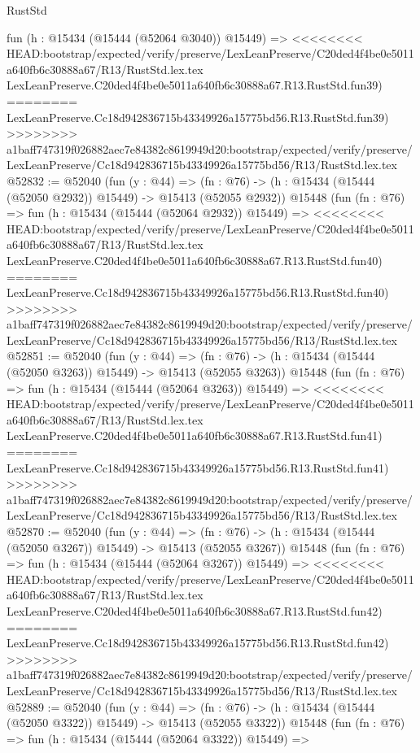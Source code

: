 \begin{lexlean}{RustStd}
\begin{coremodule}
{\begin{coremodule}
{{{{{{{{{{{{{{{{{{{{{{{{{{{{{{{{{{{{{{{{{{{{{{{{{{{{{{{{{{{{    fun (h : @15434 (@15444 (@52064 @3040)) @15449) =>
<<<<<<<< HEAD:bootstrap/expected/verify/preserve/LexLeanPreserve/C20ded4f4be0e5011a640fb6c30888a67/R13/RustStd.lex.tex
    LexLeanPreserve.C20ded4f4be0e5011a640fb6c30888a67.R13.RustStd.fun39)
========
    LexLeanPreserve.Cc18d942836715b43349926a15775bd56.R13.RustStd.fun39)
>>>>>>>> a1baff747319f026882aec7e84382c8619949d20:bootstrap/expected/verify/preserve/LexLeanPreserve/Cc18d942836715b43349926a15775bd56/R13/RustStd.lex.tex
@52832 := @52040
    (fun (y : @44) =>
    (fn : @76) -> (h : @15434 (@15444 (@52050 @2932)) @15449) -> @15413 (@52055 @2932))
    @15448
    (fun (fn : @76) =>
    fun (h : @15434 (@15444 (@52064 @2932)) @15449) =>
<<<<<<<< HEAD:bootstrap/expected/verify/preserve/LexLeanPreserve/C20ded4f4be0e5011a640fb6c30888a67/R13/RustStd.lex.tex
    LexLeanPreserve.C20ded4f4be0e5011a640fb6c30888a67.R13.RustStd.fun40)
========
    LexLeanPreserve.Cc18d942836715b43349926a15775bd56.R13.RustStd.fun40)
>>>>>>>> a1baff747319f026882aec7e84382c8619949d20:bootstrap/expected/verify/preserve/LexLeanPreserve/Cc18d942836715b43349926a15775bd56/R13/RustStd.lex.tex
@52851 := @52040
    (fun (y : @44) =>
    (fn : @76) -> (h : @15434 (@15444 (@52050 @3263)) @15449) -> @15413 (@52055 @3263))
    @15448
    (fun (fn : @76) =>
    fun (h : @15434 (@15444 (@52064 @3263)) @15449) =>
<<<<<<<< HEAD:bootstrap/expected/verify/preserve/LexLeanPreserve/C20ded4f4be0e5011a640fb6c30888a67/R13/RustStd.lex.tex
    LexLeanPreserve.C20ded4f4be0e5011a640fb6c30888a67.R13.RustStd.fun41)
========
    LexLeanPreserve.Cc18d942836715b43349926a15775bd56.R13.RustStd.fun41)
>>>>>>>> a1baff747319f026882aec7e84382c8619949d20:bootstrap/expected/verify/preserve/LexLeanPreserve/Cc18d942836715b43349926a15775bd56/R13/RustStd.lex.tex
@52870 := @52040
    (fun (y : @44) =>
    (fn : @76) -> (h : @15434 (@15444 (@52050 @3267)) @15449) -> @15413 (@52055 @3267))
    @15448
    (fun (fn : @76) =>
    fun (h : @15434 (@15444 (@52064 @3267)) @15449) =>
<<<<<<<< HEAD:bootstrap/expected/verify/preserve/LexLeanPreserve/C20ded4f4be0e5011a640fb6c30888a67/R13/RustStd.lex.tex
    LexLeanPreserve.C20ded4f4be0e5011a640fb6c30888a67.R13.RustStd.fun42)
========
    LexLeanPreserve.Cc18d942836715b43349926a15775bd56.R13.RustStd.fun42)
>>>>>>>> a1baff747319f026882aec7e84382c8619949d20:bootstrap/expected/verify/preserve/LexLeanPreserve/Cc18d942836715b43349926a15775bd56/R13/RustStd.lex.tex
@52889 := @52040
    (fun (y : @44) =>
    (fn : @76) -> (h : @15434 (@15444 (@52050 @3322)) @15449) -> @15413 (@52055 @3322))
    @15448
    (fun (fn : @76) =>
    fun (h : @15434 (@15444 (@52064 @3322)) @15449) =>
}}}}}}}}}}}}}}}}}}}}}}}}}}}}}}}}}}}}}}}}}}}}}}}}}}}}}}}}}}}}
\end{coremodule}}
\end{coremodule}
\end{lexlean}
